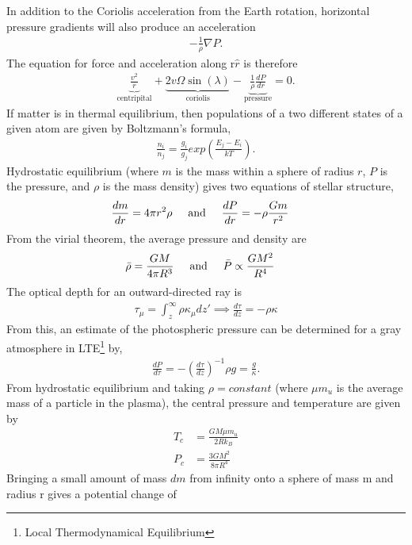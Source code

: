 \begin{multicols}{2}
In addition to the Coriolis acceleration from the Earth rotation, horizontal pressure gradients will also produce an acceleration
\begin{align}
-\frac{1}{\rho}\nabla P.
\end{align}
The equation for force and acceleration along r$\hat{r}$ is therefore
\begin{align}
\underbrace{\frac{v^2}{r}}_\text{centripital}+\underbrace{2v\Omega \sin(\lambda)}_\text{coriolis}-\underbrace{\frac{1}{\rho}\frac{dP}{dr}}_\text{pressure}=0.	
\end{align}
If matter is in thermal equilibrium, then populations of a two different
states of a given atom are given by Boltzmann’s formula,
\begin{align}
	\frac{n_i}{n_j}=\frac{g_i}{g_j}exp\left(\frac{E_j-E_i}{kT}\right).
\end{align}
Hydrostatic equilibrium (where $m$ is the mass within a sphere of radius $r$, $P$ is the pressure, and $\rho$ is the mass density) gives two equations of stellar structure,
\begin{align}
	\frac{dm}{dr} &= 4\pi r^2 \rho \andspace{0.5cm}
	\frac{dP}{dr} = -\rho \frac{Gm}{r^2}
\end{align}
From the virial theorem, the average pressure and density are
\begin{align}
	\bar{\rho} &= \frac{GM}{4\pi R^3} \andspace{0.5cm}
	\bar{P} \propto \frac{GM^2}{R^4}
\end{align}
The optical depth for an outward-directed ray is
\begin{align}
	\tau_\mu = \int_z^\infty\rho \kappa_\mu dz' \implies \frac{d\tau}{dz}=-\rho \kappa
\end{align}
From this, an estimate of the photospheric pressure can be determined  for a gray atmosphere in LTE\footnote{Local Thermodynamical Equilibrium} by,
\begin{align}
	\frac{dP}{d\tau} = -\left(\frac{d\tau}{dz}\right)^{-1}\rho g = \frac{g}{\kappa}.
\end{align}
From hydrostatic equilibrium and taking $\rho=constant$ (where $\mu m_u$ is the average mass of a particle in the plasma), the central pressure and temperature are given by
\begin{align}
	T_c &=\frac{GM\mu m_u}{2Rk_B} \\
	P_c &= \frac{3GM^2}{8\pi R^4}
\end{align}
Bringing a small amount of mass $dm$ from infinity onto a sphere of mass m and radius r gives a potential change of

\end{multicols}
